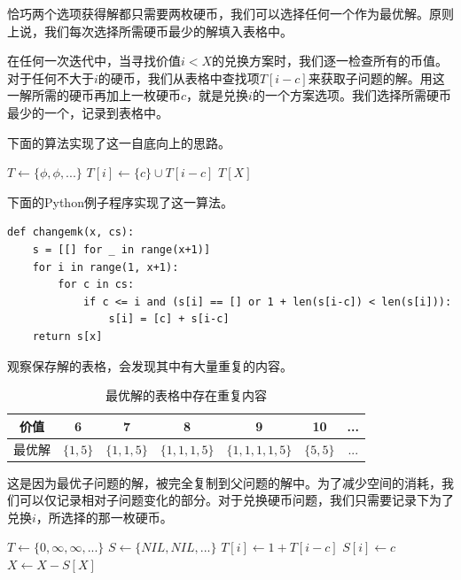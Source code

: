 \documentclass[b5paper]{ctexart}
\begin{document}
恰巧两个选项获得解都只需要两枚硬币，我们可以选择任何一个作为最优解。原则上说，我们每次选择所需硬币最少的解填入表格中。

在任何一次迭代中，当寻找价值$i < X$的兑换方案时，我们逐一检查所有的币值。对于任何不大于$i$的硬币，我们从表格中查找项$T[i-c]$来获取子问题的解。用这一解所需的硬币再加上一枚硬币$c$，就是兑换$i$的一个方案选项。我们选择所需硬币最少的一个，记录到表格中。

下面的算法实现了这一自底向上的思路。

\begin{algorithmic}[1]
  \State $T \gets \{ \phi, \phi, ... \}$
        \State $T[i] \gets \{ c \} \cup T[i-c]$
      \EndIf
    \EndFor
  \EndFor
  \State \Return $T[X]$
\EndFunction
\end{algorithmic}

下面的Python例子程序实现了这一算法。

\lstset{language=Python}
\begin{lstlisting}
def changemk(x, cs):
    s = [[] for _ in range(x+1)]
    for i in range(1, x+1):
        for c in cs:
            if c <= i and (s[i] == [] or 1 + len(s[i-c]) < len(s[i])):
                s[i] = [c] + s[i-c]
    return s[x]
\end{lstlisting}

观察保存解的表格，会发现其中有大量重复的内容。

\begin{table}[htbp]
\centering
\begin{tabular}{c||c|c|c|c|c|c|}
\hline
价值 & 6 & 7 & 8 & 9 & 10 & ... \\
\hline
最优解 & $\{ 1, 5 \}$ & $\{1, 1, 5\}$ & $\{1, 1, 1, 5\}$ & $\{1, 1, 1, 1, 5\}$ & $\{ 5, 5 \}$ & ... \\
\hline
\end{tabular}
\caption{最优解的表格中存在重复内容} %
\end{table}

这是因为最优子问题的解，被完全复制到父问题的解中。为了减少空间的消耗，我们可以仅记录相对子问题变化的部分。对于兑换硬币问题，我们只需要记录下为了兑换$i$，所选择的那一枚硬币。

\begin{algorithmic}[1]
  \State $T \gets \{ 0, \infty, \infty, ... \}$
  \State $S \gets \{ NIL, NIL, ... \}$
        \State $T[i] \gets 1 + T[i-c]$
        \State $S[i] \gets c$
      \EndIf
    \EndFor
  \EndFor
    \State {}
    \State $X \gets X - S[X]$
  \EndWhile
\EndFunction
\end{algorithmic}
\end{document}

